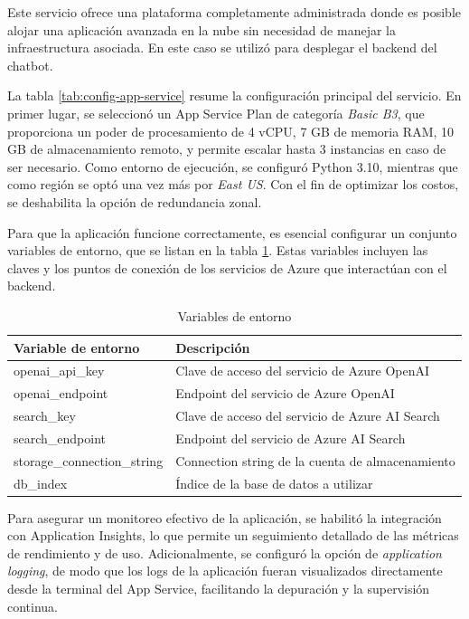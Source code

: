 Este servicio ofrece una plataforma completamente administrada donde es posible alojar una aplicación avanzada en la nube 
sin necesidad de manejar la infraestructura asociada. En este caso se utilizó para desplegar el backend del chatbot.

La tabla \ref{tab:config-app-service} resume la configuración principal del servicio. En primer lugar, se seleccionó un App Service Plan de categoría \textit{Basic B3}, que proporciona un poder de procesamiento de 
4 vCPU, 7 GB de memoria RAM, 10 GB de almacenamiento remoto, y permite escalar hasta 3 instancias en caso de ser necesario. 
Como entorno de ejecución, se configuró Python 3.10, mientras que como región se optó una vez más por \textit{East US}. Con el 
fin de optimizar los costos, se deshabilita la opción de redundancia zonal.

Para que la aplicación funcione correctamente, es esencial configurar un conjunto variables de entorno, que se listan en la tabla \ref{tab:config-env}. Estas 
variables incluyen las claves y los puntos de conexión de los servicios de Azure que interactúan con el backend. 

\begin{table}[h]
	\centering
	\caption[Variables de entorno]{Variables de entorno}
	\begin{tabular}{l l}    
		\toprule
		\textbf{Variable de entorno}  & \textbf{Descripción} 	                          \\
		\midrule
		openai\_api\_key              &	Clave de acceso del servicio de Azure OpenAI 	  \\		
		openai\_endpoint              & Endpoint del servicio de Azure OpenAI			  \\
		search\_key                   & Clave de acceso del servicio de Azure AI Search   \\
		search\_endpoint	          & Endpoint del servicio de Azure AI Search		  \\
        storage\_connection\_string   & Connection string de la cuenta de almacenamiento  \\
		db\_index	                  & Índice de la base de datos a utilizar		      \\
		\bottomrule
		\hline
	\end{tabular}
	\label{tab:config-env}
\end{table}

Para asegurar un monitoreo efectivo de la aplicación, se habilitó la integración con Application Insights, lo que permite un 
seguimiento detallado de las métricas de rendimiento y de uso. Adicionalmente, se configuró la opción de \textit{application logging}, 
de modo que los logs de la aplicación fueran visualizados directamente desde la terminal del App Service, facilitando la depuración 
y la supervisión continua.

